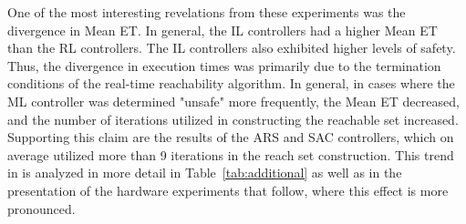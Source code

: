 \documentclass[manuscript,screen,review]{acmart}
\newcommand{\todo}[1]{\textcolor{red}{\textbf{\underline{TODO:}} #1}}
\begin{document}

One of the most interesting revelations from these experiments was the divergence in Mean ET. In general, the IL controllers had a higher Mean ET than the RL controllers. The IL controllers
also exhibited higher levels of safety. Thus, the divergence in execution times was primarily due to the termination conditions of the real-time reachability algorithm. In general, in cases where the ML controller was determined "unsafe" more frequently, the Mean ET decreased, and the number of iterations utilized in constructing the reachable set increased. Supporting this claim are the results of the ARS and SAC controllers, which on average utilized more than 9 iterations in the reach set construction. This trend in is analyzed in more detail in Table~\ref{tab:additional} as well as in the presentation of the hardware experiments that follow, where this effect is more pronounced.




\end{document}
